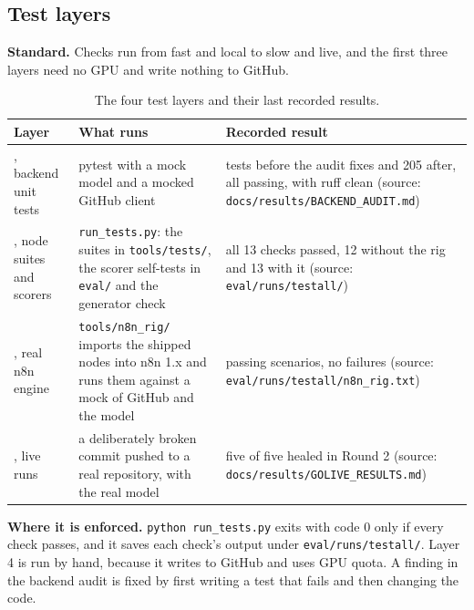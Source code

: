 \subsection{Test layers}

\textbf{Standard.} Checks run from fast and local to slow and live, and the first three layers need no GPU and write nothing to GitHub.

\begin{table}[!htbp]
\centering
\small
\begin{tabularx}{\linewidth}{>{\raggedright\arraybackslash}p{1.6cm}>{\raggedright\arraybackslash}X>{\raggedright\arraybackslash}X}
\toprule
\textbf{Layer} & \textbf{What runs} & \textbf{Recorded result} \\
\midrule
1, backend unit tests & pytest with a mock model and a mocked GitHub client & 157 tests before the audit fixes and 205 after, all passing, with ruff clean (source: \texttt{docs/\allowbreak{}results/\allowbreak{}BACKEND\_\allowbreak{}AUDIT.md}) \\
2, node suites and scorers & \texttt{run\_\allowbreak{}tests.py}: the suites in \texttt{tools/\allowbreak{}tests/\allowbreak{}}, the scorer self-tests in \texttt{eval/\allowbreak{}} and the generator check & all 13 checks passed, 12 without the rig and 13 with it (source: \texttt{eval/\allowbreak{}runs/\allowbreak{}testall/\allowbreak{}}) \\
3, real n8n engine & \texttt{tools/\allowbreak{}n8n\_\allowbreak{}rig/\allowbreak{}} imports the shipped nodes into n8n 1.x and runs them against a mock of GitHub and the model & 18 passing scenarios, no failures (source: \texttt{eval/\allowbreak{}runs/\allowbreak{}testall/\allowbreak{}n8n\_\allowbreak{}rig.txt}) \\
4, live runs & a deliberately broken commit pushed to a real repository, with the real model & five of five healed in Round 2 (source: \texttt{docs/\allowbreak{}results/\allowbreak{}GOLIVE\_\allowbreak{}RESULTS.md}) \\
\bottomrule
\end{tabularx}
\caption{The four test layers and their last recorded results.}
\label{tab:layers}
\end{table}

\textbf{Where it is enforced.} \texttt{python run\_tests.py} exits with code 0 only if every check passes, and it saves each check's output under \texttt{eval/\allowbreak{}runs/\allowbreak{}testall/\allowbreak{}}. Layer 4 is run by hand, because it writes to GitHub and uses GPU quota. A finding in the backend audit is fixed by first writing a test that fails and then changing the code.

